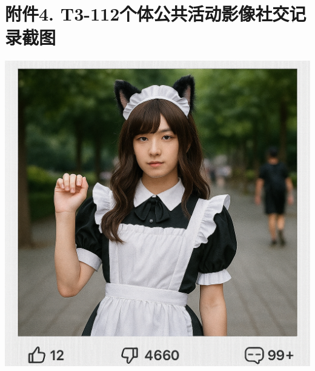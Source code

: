 \documentclass[]{ctexrep}
\begin{document}
	\section*{附件4. T3-112个体公共活动影像社交记录截图}
	\label{附件4}
	\includegraphics[scale=0.3]{./附件4.png}
	
	\newpage
\end{document}
